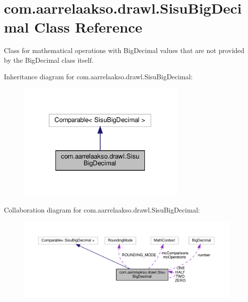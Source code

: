 \hypertarget{classcom_1_1aarrelaakso_1_1drawl_1_1_sisu_big_decimal}{}\section{com.\+aarrelaakso.\+drawl.\+Sisu\+Big\+Decimal Class Reference}
\label{classcom_1_1aarrelaakso_1_1drawl_1_1_sisu_big_decimal}


Class for mathematical operations with Big\+Decimal values that are not provided by the Big\+Decimal class itself.  




Inheritance diagram for com.\+aarrelaakso.\+drawl.\+Sisu\+Big\+Decimal\+:\nopagebreak
\begin{figure}[H]
\begin{center}
\leavevmode
\includegraphics[width=237pt]{dd/d6b/classcom_1_1aarrelaakso_1_1drawl_1_1_sisu_big_decimal__inherit__graph}
\end{center}
\end{figure}


Collaboration diagram for com.\+aarrelaakso.\+drawl.\+Sisu\+Big\+Decimal\+:\nopagebreak
\begin{figure}[H]
\begin{center}
\leavevmode
\includegraphics[width=350pt]{d4/d6c/classcom_1_1aarrelaakso_1_1drawl_1_1_sisu_big_decimal__coll__graph}
\end{center}
\end{figure}
